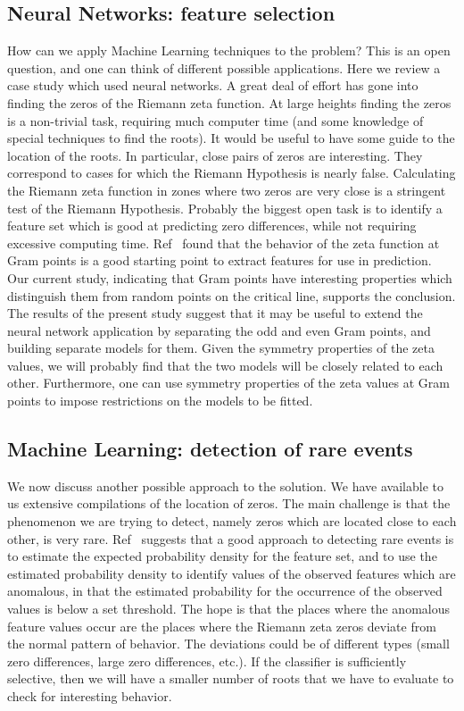 \documentclass[twoside]{article}
\theoremstyle{definition}
\begin{document}
{\subsection{\label{secfeature}Neural Networks: feature selection}
How can we apply Machine Learning techniques to the problem? This is an open question, and one can think of different possible applications. Here we review a case study which used neural networks. A great deal of effort has gone into finding the zeros of the Riemann zeta function. At large heights finding the zeros is a non-trivial task, requiring much computer time (and some knowledge of special techniques to find the roots). It would be useful to have some guide to the location of the roots. In particular, close pairs of zeros are interesting. They correspond to cases for which the
Riemann Hypothesis is nearly false. Calculating the Riemann zeta function in zones where
two zeros are very close is a stringent test of the Riemann Hypothesis. Probably the biggest open task is to identify a feature set which is good at predicting zero differences, while not requiring excessive computing time. Ref~\cite{osneural} found that the behavior of the zeta function at Gram points is a good starting point to extract features for use in prediction. Our current study, indicating that Gram points have interesting properties which distinguish them from random points on the critical line, supports the conclusion. The results of the present study suggest that it may be useful to extend the neural network application by separating the odd and even Gram points, and building separate models for them. Given the symmetry properties of the zeta values, we will probably find that the two models will be closely related to each other.  Furthermore, one can use symmetry properties of the zeta values at Gram points to impose restrictions on the models to be fitted.  

\subsection{\label{secMLrare}Machine Learning: detection of rare events}

We now discuss another possible approach to the solution. We have available to us extensive compilations of the location of zeros. The main challenge is that the phenomenon we are trying to detect, namely zeros which are located close to each other, is very rare. 
Ref~\cite{Friedman(2001)} suggests that  a good approach to detecting rare events is to estimate the expected probability density for the feature set, and to use the estimated probability density to identify values of the observed features which are anomalous, in that the estimated probability for the occurrence of the observed values is below a set threshold. The hope is that the places where the anomalous feature values occur are the places where the Riemann zeta zeros deviate from the normal pattern of behavior. The deviations could be of different types (small zero differences, large zero differences, etc.). If the classifier is sufficiently selective, then we will have a smaller number of roots that we have to evaluate to check for interesting behavior. 

}
\end{document}
